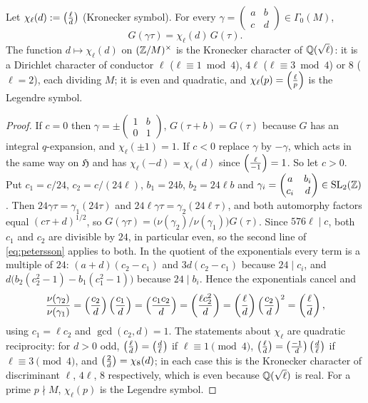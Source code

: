 \begin{lemma}[multiplier of $G$]\label{lem:mult}
Let $\chi_\ell(d):=\left(\frac{\ell}{d}\right)$ (Kronecker symbol). For every
$\gamma=\begin{pmatrix}a&b\\c&d\end{pmatrix}\in\Gamma_0(M)$,
\[
G(\gamma\tau)=\chi_\ell(d)\,G(\tau).
\]
The function $d\mapsto\chi_\ell(d)$ on $(\mathbb Z/M)^\times$ is the Kronecker character of
$\mathbb Q(\sqrt\ell)$: it is a Dirichlet character of conductor $\ell$ ($\ell\equiv1\bmod4$),
$4\ell$ ($\ell\equiv3\bmod4$) or $8$ ($\ell=2$), each dividing $M$; it is even and quadratic, and
$\chi_\ell(p)=\left(\frac{\ell}{p}\right)$ is the Legendre symbol.
\end{lemma}
\begin{proof}
If $c=0$ then $\gamma=\pm\begin{pmatrix}1&b\\0&1\end{pmatrix}$, $G(\tau+b)=G(\tau)$ because $G$ has
an integral $q$-expansion, and $\chi_\ell(\pm1)=1$. If $c<0$ replace $\gamma$ by $-\gamma$, which
acts in the same way on $\mathfrak H$ and has $\chi_\ell(-d)=\chi_\ell(d)$ since $\left(\frac{\ell}{-1}\right)=1$.
So let $c>0$. Put $c_1=c/24$, $c_2=c/(24\ell)$, $b_1=24b$, $b_2=24\ell b$ and
$\gamma_i=\begin{pmatrix}a&b_i\\c_i&d\end{pmatrix}\in\mathrm{SL}_2(\mathbb Z)$. Then
$24\gamma\tau=\gamma_1(24\tau)$ and $24\ell\gamma\tau=\gamma_2(24\ell\tau)$, and both automorphy
factors equal $(c\tau+d)^{1/2}$, so $G(\gamma\tau)=\bigl(\nu(\gamma_2)/\nu(\gamma_1)\bigr)G(\tau)$.
Since $576\ell\mid c$, both $c_1$ and $c_2$ are divisible by $24$, in particular even, so the second
line of \eqref{eq:petersson} applies to both. In the quotient of the exponentials every term is a
multiple of $24$: $(a+d)(c_2-c_1)$ and $3d(c_2-c_1)$ because $24\mid c_i$, and
$d\bigl(b_2(c_2^2-1)-b_1(c_1^2-1)\bigr)$ because $24\mid b_i$. Hence the exponentials cancel and
\[
\frac{\nu(\gamma_2)}{\nu(\gamma_1)}=\left(\frac{c_2}{d}\right)\left(\frac{c_1}{d}\right)=\left(\frac{c_1c_2}{d}\right)=\left(\frac{\ell c_2^2}{d}\right)
=\left(\frac{\ell}{d}\right)\left(\frac{c_2}{d}\right)^{2}=\left(\frac{\ell}{d}\right),
\]
using $c_1=\ell c_2$ and $\gcd(c_2,d)=1$. The statements about $\chi_\ell$ are quadratic
reciprocity: for $d>0$ odd, $\left(\frac{\ell}{d}\right)=\left(\frac{d}{\ell}\right)$ if $\ell\equiv1\pmod 4$,
$\left(\frac{\ell}{d}\right)=\left(\frac{-1}{d}\right)\left(\frac{d}{\ell}\right)$ if $\ell\equiv3\pmod4$, and $\left(\frac{2}{d}\right)=\chi_8(d)$; in each
case this is the Kronecker character of discriminant $\ell$, $4\ell$, $8$ respectively, which is even
because $\mathbb Q(\sqrt\ell)$ is real. For a prime $p\nmid M$, $\chi_\ell(p)$ is the Legendre symbol.
\end{proof}

